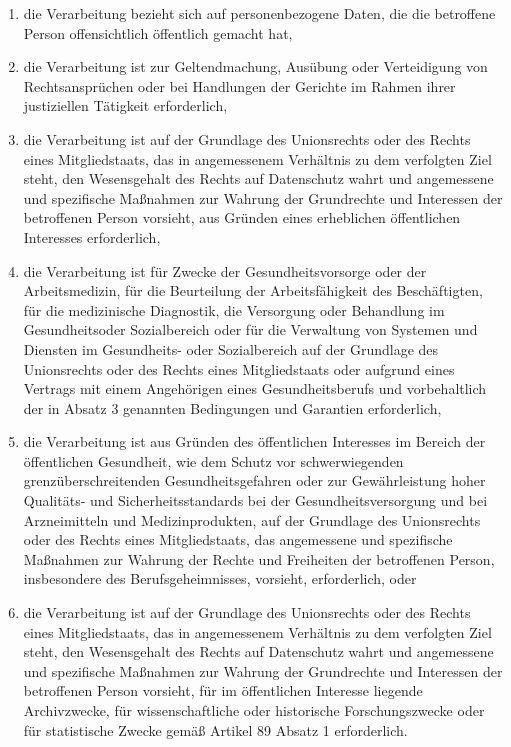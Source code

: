 \begin{enumerate}
\begin{enumerate}[label=\alph*)]
                    \item die Verarbeitung bezieht sich auf personenbezogene Daten, die die betroffene Person offensichtlich öffentlich gemacht hat,
                    \item die Verarbeitung ist zur Geltendmachung, Ausübung oder Verteidigung von Rechtsansprüchen oder bei Handlungen der Gerichte im Rahmen ihrer justiziellen Tätigkeit erforderlich, 
                    \item die Verarbeitung ist auf der Grundlage des Unionsrechts oder des Rechts eines Mitgliedstaats, das in angemessenem Verhältnis zu dem verfolgten Ziel steht, den Wesensgehalt des Rechts auf Datenschutz wahrt und angemessene und spezifische Maßnahmen zur Wahrung der Grundrechte und Interessen der betroffenen Person vorsieht, aus Gründen eines erheblichen öffentlichen Interesses erforderlich,
                    \item die Verarbeitung ist für Zwecke der Gesundheitsvorsorge oder der Arbeitsmedizin, für die Beurteilung der Arbeitsfähigkeit des Beschäftigten, für die medizinische Diagnostik, die Versorgung oder Behandlung im Gesundheitsoder Sozialbereich oder für die Verwaltung von Systemen und Diensten im Gesundheits- oder Sozialbereich auf der Grundlage des Unionsrechts oder des Rechts eines Mitgliedstaats oder aufgrund eines Vertrags mit einem Angehörigen eines Gesundheitsberufs und vorbehaltlich der in Absatz 3 genannten Bedingungen und Garantien erforderlich,
                    \item die Verarbeitung ist aus Gründen des öffentlichen Interesses im Bereich der öffentlichen Gesundheit, wie dem Schutz vor schwerwiegenden grenz\-über\-schrei\-ten\-den Gesundheitsgefahren oder zur Gewährleistung hoher Qualitäts- und Sicherheitsstandards bei der Gesundheitsversorgung und bei Arzneimitteln und Medizinprodukten, auf der Grundlage des Unionsrechts oder des Rechts eines Mitgliedstaats, das angemessene und spezifische Maßnahmen zur Wahrung der Rechte und Freiheiten der betroffenen Person, insbesondere des Berufsgeheimnisses, vorsieht, erforderlich, oder
                    \item die Verarbeitung ist auf der Grundlage des Unionsrechts oder des Rechts eines Mitgliedstaats, das in angemessenem Verhältnis zu dem verfolgten Ziel steht, den Wesensgehalt des Rechts auf Datenschutz wahrt und angemessene und spezifische Maßnahmen zur Wahrung der Grundrechte und Interessen der betroffenen Person vorsieht, für im öffentlichen Interesse liegende Archivzwecke, für wissenschaftliche oder historische Forschungszwecke oder für statistische Zwecke gemäß Artikel 89 Absatz 1 erforderlich.

\end{enumerate}
\end{enumerate}

